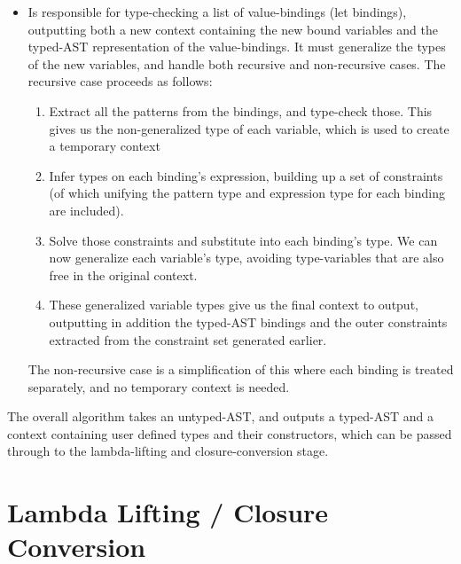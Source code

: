 \begin{itemize}
\item {} Is responsible for type-checking a list of value-bindings (let bindings), outputting both a new context containing the new bound variables and the typed-AST representation of the value-bindings. It must generalize the types of the new variables, and handle both recursive and non-recursive cases. The recursive case proceeds as follows:
\begin{enumerate}
\item Extract all the patterns from the bindings, and type-check those. This gives us the non-generalized type of each variable, which is used to create a temporary context
\item Infer types on each binding's expression, building up a set of constraints (of which unifying the pattern type and expression type for each binding are included).
\item Solve those constraints and substitute into each binding's type. We can now generalize each variable's type, avoiding type-variables that are also free in the original context.
\item These generalized variable types give us the final context to output, outputting in addition the typed-AST bindings and the outer constraints extracted from the constraint set generated earlier.
\end{enumerate}
The non-recursive case is a simplification of this where each binding is treated separately, and no temporary context is needed.
\end{itemize}
\noindent
The overall algorithm takes an untyped-AST, and outputs a typed-AST and a context containing user defined types and their constructors, which can be passed through to the lambda-lifting and closure-conversion stage.

\section{Lambda Lifting / Closure Conversion}


